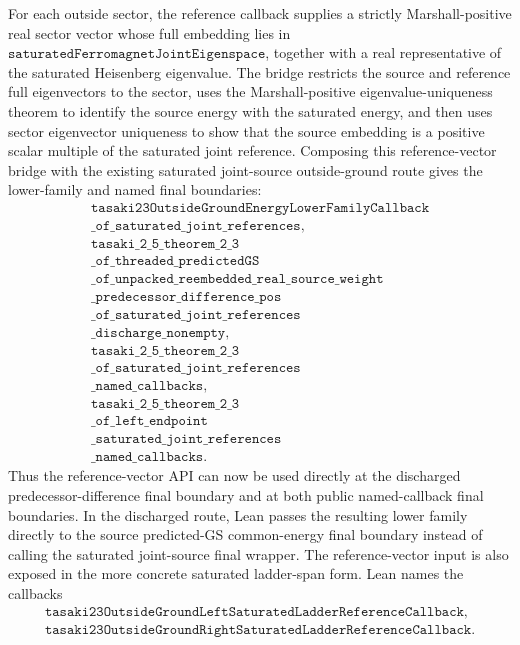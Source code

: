 \documentclass[a4paper,11pt]{article}
\begin{document}
For each outside sector, the reference callback supplies a strictly
Marshall-positive real sector vector whose full embedding lies in
\(\texttt{saturatedFerromagnetJointEigenspace}\), together with a real
representative of the saturated Heisenberg eigenvalue.  The bridge restricts
the source and reference full eigenvectors to the sector, uses the
Marshall-positive eigenvalue-uniqueness theorem to identify the source energy
with the saturated energy, and then uses sector eigenvector uniqueness to show
that the source embedding is a positive scalar multiple of the saturated joint
reference.
Composing this reference-vector bridge with the existing saturated
joint-source outside-ground route gives the lower-family and named final
boundaries:
\[
\begin{gathered}
\texttt{tasaki23OutsideGroundEnergyLowerFamilyCallback}\\
\texttt{\_of\_saturated\_joint\_references},\\
\texttt{tasaki\_2\_5\_theorem\_2\_3}\\
\texttt{\_of\_threaded\_predictedGS}\\
\texttt{\_of\_unpacked\_reembedded\_real\_source\_weight}\\
\texttt{\_predecessor\_difference\_pos}\\
\texttt{\_of\_saturated\_joint\_references}\\
\texttt{\_discharge\_nonempty},\\
\texttt{tasaki\_2\_5\_theorem\_2\_3}\\
\texttt{\_of\_saturated\_joint\_references}\\
\texttt{\_named\_callbacks},\\
\texttt{tasaki\_2\_5\_theorem\_2\_3}\\
\texttt{\_of\_left\_endpoint}\\
\texttt{\_saturated\_joint\_references}\\
\texttt{\_named\_callbacks}.
\end{gathered}
\]
Thus the reference-vector API can now be used directly at the discharged
predecessor-difference final boundary and at both public named-callback final
boundaries.  In the discharged route, Lean passes the resulting lower family
directly to the source predicted-GS common-energy final boundary instead of
calling the saturated joint-source final wrapper.
The reference-vector input is also exposed in the more concrete saturated
ladder-span form.  Lean names the callbacks
\[
\begin{gathered}
\texttt{tasaki23OutsideGroundLeftSaturatedLadderReferenceCallback},\\
\texttt{tasaki23OutsideGroundRightSaturatedLadderReferenceCallback}.
\end{gathered}
\]
\end{document}
